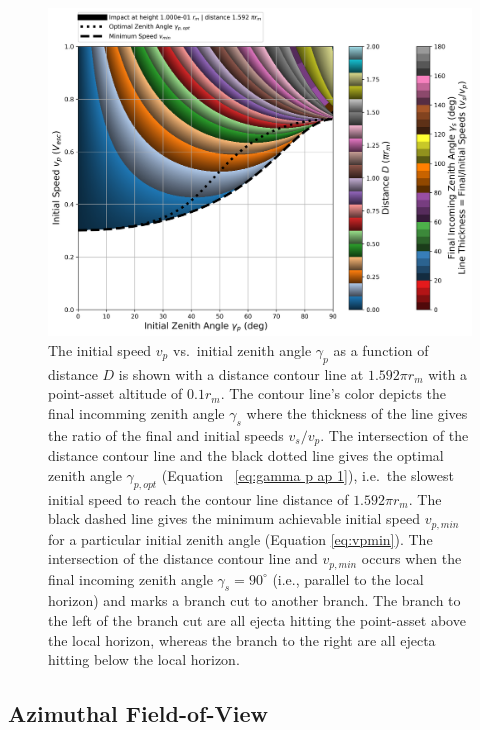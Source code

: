 \documentclass{article}
\begin{document}
\begin{figure}[!htb]
	\centering
	\includegraphics[width=1.0\linewidth]{dist_speed_zenith_plot_023_1.000e-01_5.000.png}
	\caption{The initial speed $v_p$ vs.\ initial zenith angle $\gamma_p$ as a function of distance $D$ is shown with a distance contour line at $1.592\pi r_m$ with a point-asset altitude of $0.1 r_m$. The contour line's color depicts the final incomming zenith angle $\gamma_s$ where the thickness of the line gives the ratio of the final and initial speeds $v_s/v_p$. The intersection of the distance contour line and the black dotted line gives the optimal zenith angle $\gamma_{p,opt}$ (Equation~
		\eqref{eq:gamma p ap 1}), i.e.\ the slowest initial speed to reach the contour line distance of $1.592\pi r_m$. The black dashed line gives the minimum achievable initial speed $v_{p,min}$ for a particular initial zenith angle (Equation \eqref{eq:vpmin}). The intersection of the distance contour line and $v_{p,min}$ occurs when the final incoming zenith angle $\gamma_s = 90^\circ$ (i.e., parallel to the local horizon) and marks a branch cut to another branch. The branch to the left of the branch cut are all ejecta hitting the point-asset above the local horizon, whereas the branch to the right are all ejecta hitting below the local horizon.}\label{fig:dist_speed_zenith_plot_023_1.000e-01_5.000}
\end{figure}

\clearpage


\subsection{Azimuthal Field-of-View}\label{ssec:Azimuthal Field of View}
\end{document}
